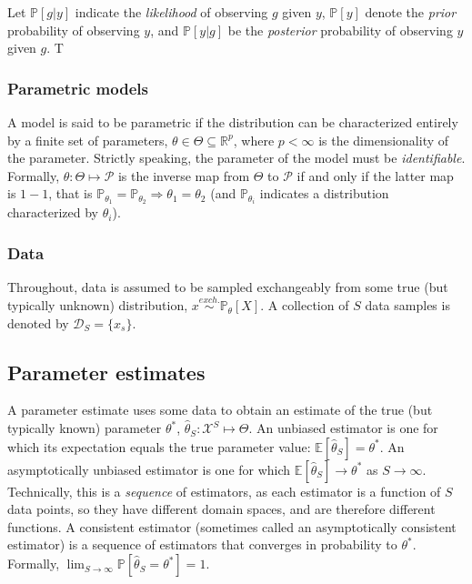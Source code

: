 \documentclass[10pt,journal,cspaper,compsoc]{IEEEtran}
\providecommand{\mc}[1]{\mathcal{#1}}
\providecommand{\mh}[1]{\hat{#1}}
\newcommand{\Real}{\mathbb{R}}
\newcommand{\PP}{\mathbb{P}}
\newcommand{\EE}{\mathbb{E}}
\newcommand{\conv}{\rightarrow}
\newcommand{\thet}{\theta}
\newcommand{\hth}{\mh{\thet}}
\newcommand{\Thet}{\Theta}
\begin{document}
Let $\PP[g|y]$ indicate the \emph{likelihood} of observing $g$ given $y$, $\PP[y]$ denote the \emph{prior} probability of observing $y$, and $\PP[y|g]$ be the \emph{posterior} probability of observing $y$ given $g$.  T
 


\subsubsection{Parametric models} %
\label{ssub:parameters}

A model is said to be parametric if the distribution can be characterized entirely by a finite set of parameters, $\thet \in \Thet \subseteq \Real^p$, where $p<\infty$ is the dimensionality of the parameter. Strictly speaking, the parameter of the model must be \emph{identifiable}.  Formally, $\thet: \Thet \mapsto \mc{P}$ is the inverse map from $\Thet$ to $\mc{P}$ if and only if the latter map is $1-1$, that is $\PP_{\thet_1}=\PP_{\thet_2} \Rightarrow \thet_1=\thet_2$ (and $\PP_{\thet_i}$ indicates a distribution characterized by $\thet_i$).




\subsubsection{Data} %
\label{ssub:data}


Throughout, data is assumed to be sampled exchangeably from some true (but typically unknown) distribution, $x \overset{exch.}{\sim} \PP_\thet[X]$.  A collection of $S$ data samples is denoted by $\mc{D}_S=\{x_s\}$.




\subsection{Parameter estimates} %
\label{sub:estimators}

A parameter estimate uses some data to obtain an estimate of the true (but typically known) parameter $\thet^*$, $\hth_S: \mc{X}^S \mapsto \Thet$.  An unbiased estimator is one for which its expectation equals the true parameter value: $\EE[\hth_S] = \thet^*$.  An asymptotically unbiased estimator is one for which $\EE[\hth_S] \conv \thet^*$ as $S \conv \infty$. Technically, this is a \emph{sequence} of estimators, as each estimator is a function of $S$ data points, so they have different domain spaces, and are therefore different functions.   A consistent estimator (sometimes called an asymptotically consistent estimator) is a sequence of estimators that converges in probability to $\thet^*$. Formally, $\lim_{S\conv \infty} \PP[\hth_S=\thet^*]=1$.
\end{document}
